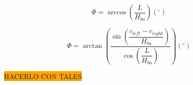 \begin{equation}
 \Phi = \arccos{\left(\dfrac{L}{H_{ba}}\right)} (^{\circ})
\label{def_angulo_phi_2}
\end{equation}

\begin{equation}
 \Phi = \arctan{\left(\dfrac{\sin{\left(\dfrac{c_{left} - c_{right}}{H_{ba}}\right)}}{\cos{\left(\dfrac{L}{H_{ba}}\right)}}\right)} (^{\circ}) 
\label{def_angulo_phi_3}
\end{equation}

\colorbox{orange}{HACERLO CON TALES}


\\










